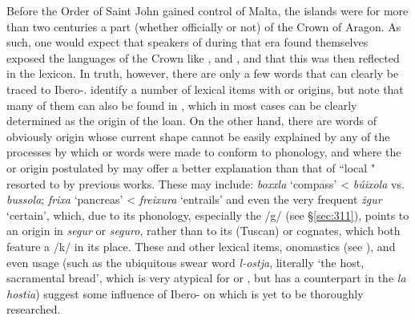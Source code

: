 \documentclass[output=paper]{langsci/langscibook}
\begin{document}
Before the Order of Saint John gained control of Malta, the islands were for more than two centuries a part (whether officially or not) of the Crown of Aragon. As such, one would expect that speakers of  during that era found themselves exposed the languages of the Crown like ,  and , and that this was then reflected in the  lexicon. In truth, however, there are only a few  words that can clearly be traced to Ibero-. \cite{catalan2017} identify a number of lexical items with  or  origins, but note that many of them can also be found in , which in most cases can be clearly determined as the origin of the loan. On the other hand, there are  words of obviously  origin whose current shape cannot be easily explained by any of the processes by which  or  words were made to conform to  phonology, and where the  or  origin postulated by \cite{catalan2017} may offer a better explanation than that of ``local " resorted to by previous works. These may include: \textit{boxxla} `compass' <  \textit{búixola} vs.  \textit{bussola}; \textit{frixa} `pancreas' <  \textit{freixura} `entrails' and even the very frequent \textit{żgur} `certain', which, due to its phonology, especially the /g/ (see §\ref{sec:311}), points to an origin in  \textit{segur} or  \textit{seguro}, rather than to its (Tuscan)  or  cognates, which both feature a /k/ in its place. These and other lexical items, onomastics (see \citealt[46]{catalan2017}), and even usage (such as the ubiquitous  swear word \textit{l-ostja}, literally `the host, sacramental bread', which is very atypical for  or , but has a counterpart in the  \textit{la hostia}) suggest some influence of Ibero- on  which is yet to be thoroughly researched.
\end{document}
